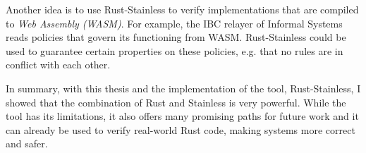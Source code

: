 Another idea is to use Rust-Stainless to verify implementations that are
compiled to \emph{Web Assembly (WASM)}. For example, the IBC relayer of Informal
Systems reads policies that govern its functioning from WASM. Rust-Stainless
could  be used to guarantee certain properties on these policies, e.g. that no
rules are in conflict with each other.


\hfill \break \noindent  In summary, with this thesis and the implementation of
the tool, Rust-Stainless, I showed that the combination of Rust and Stainless is
very powerful. While the tool has its limitations, it also offers many promising
paths for future work and  it can already be used to verify real-world Rust
code, making systems more correct and safer.

